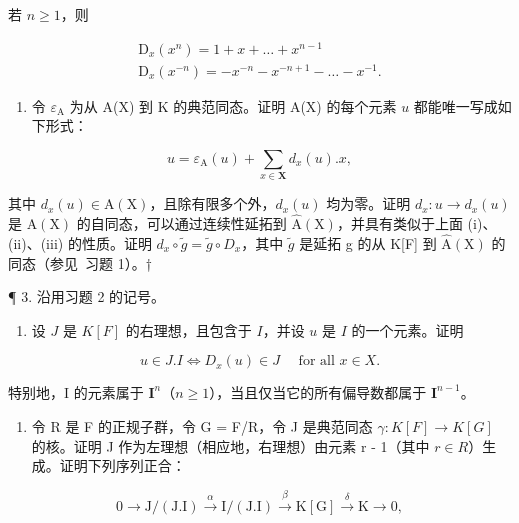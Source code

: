 若 \(n\geqslant 1\)，则

\[
\begin{array}{c} \mathrm{D} _ {x} (x ^ {n}) = 1 + x + \dots + x ^ {n - 1} \\ \mathrm{D} _ {x} (x ^ {- n}) = - x ^ {- n} - x ^ {- n + 1} - \dots - x ^ {- 1}. \end{array}
\]

\begin{enumerate}
\def\labelenumi{(\alph{enumi})}
\setcounter{enumi}{3}
\tightlist
\item
  令 \(\varepsilon_{\mathrm{A}}\) 为从 A(X) 到 K 的典范同态。证明 A(X) 的每个元素 \(u\) 都能唯一写成如下形式：
\end{enumerate}

\[
u = \varepsilon_ {\mathrm{A}} (u) + \sum_ {x \in \mathbf {X}} d _ {x} (u). x,
\]

其中 \(d_{x}(u) \in \mathrm{A}(\mathrm{X})\)，且除有限多个外，\(d_{x}(u)\) 均为零。证明 \(d_{x}: u \to d_{x}(u)\) 是 \(\mathrm{A}(\mathrm{X})\) 的自同态，可以通过连续性延拓到 \(\hat{\mathrm{A}}(\mathrm{X})\)，并具有类似于上面 (i)、(ii)、(iii) 的性质。证明 \(d_{x} \circ \tilde{g} = \tilde{g} \circ D_{x}\)，其中 \(\tilde{g}\) 是延拓 g 的从 K{[}F{]} 到 \(\hat{\mathrm{A}}(\mathrm{X})\) 的同态（参见~习题 1）。†

¶ 3. 沿用习题 2 的记号。

\begin{enumerate}
\def\labelenumi{(\alph{enumi})}
\tightlist
\item
  设 \(J\) 是 \(K[F]\) 的右理想，且包含于 \(I\)，并设 \(u\) 是 \(I\) 的一个元素。证明
\end{enumerate}

\[
u \in J. I \Leftrightarrow D _ {x} (u) \in J \quad \text { for   all } x \in X.
\]

特别地，I 的元素属于 \(\mathbf{I}^n\)（\(n \geqslant 1\)），当且仅当它的所有偏导数都属于 \(\mathbf{I}^{n-1}\)。


\begin{enumerate}
\def\labelenumi{(\alph{enumi})}
\setcounter{enumi}{1}
\tightlist
\item
  令 R 是 F 的正规子群，令 G = F/R，令 J 是典范同态 \(\gamma: K[F] \to K[G]\) 的核。证明 J 作为左理想（相应地，右理想）由元素 r - 1（其中 \(r \in R\)）生成。证明下列序列正合：
\end{enumerate}

\[
0 \longrightarrow \mathrm{J} / (\mathrm{J}. \mathrm{I}) \stackrel {\alpha} {\longrightarrow} \mathrm{I} / (\mathrm{J}. \mathrm{I}) \stackrel {\beta} {\longrightarrow} \mathrm{K} [ \mathrm{G} ] \stackrel {\delta} {\longrightarrow} \mathrm{K} \longrightarrow 0,\tag{*}
\]

